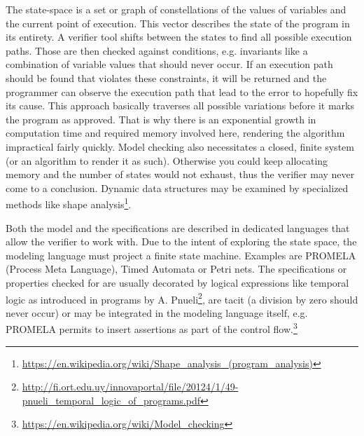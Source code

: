 The state-space is a set or graph of constellations of the values of variables and the current point of execution. This vector describes the state of the program in its entirety. A verifier tool shifts between the states to find all possible execution paths. Those are then checked against conditions, e.g. invariants like a combination of variable values that should never occur. If an execution path should be found that violates these constraints, it will be returned and the programmer can observe the execution path that lead to the error to hopefully fix its cause. This approach basically traverses all possible variations before it marks the program as approved. That is why there is an exponential growth in computation time and required memory involved here, rendering the algorithm impractical fairly quickly. Model checking also necessitates a closed, finite system (or an algorithm to render it as such). Otherwise you could keep allocating memory and the number of states would not exhaust, thus the verifier may never come to a conclusion. Dynamic data structures may be examined by specialized methods like shape analysis\footnote{\url{https://en.wikipedia.org/wiki/Shape_analysis_(program_analysis)}}.

Both the model and the specifications are described in dedicated languages that allow the verifier to work with. Due to the intent of exploring the state space, the modeling language must project a finite state machine. Examples are PROMELA (Process Meta Language), Timed Automata or Petri nets. The specifications or properties checked for are usually decorated by logical expressions like temporal logic as introduced in programs by A. Pnueli\footnote{\url{http://fi.ort.edu.uy/innovaportal/file/20124/1/49-pnueli_temporal_logic_of_programs.pdf}}, are tacit (a division by zero should never occur) or may be integrated in the modeling language itself, e.g. PROMELA permits to insert assertions as part of the control flow.\footnote{\url{https://en.wikipedia.org/wiki/Model_checking}}

%
%

